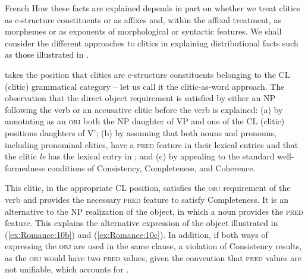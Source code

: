 \documentclass[output=paper,hidelinks]{langscibook}
\begin{document}
\ea\label{ex:Romance:10}French \citep[88]{Grimshaw1982}
\z\z
How these facts are explained depends in part on whether we treat clitics as c-structure constituents or as affixes and, within the affixal treatment, as morphemes or as exponents of morphological or syntactic features. We shall consider the different approaches to clitics in explaining distributional facts such as those illustrated in .

\citet{Grimshaw1982} takes the position that clitics are c-structure constituents belonging to the CL (clitic) grammatical category -- let us call it the clitic-as-word approach. The observation that the direct object requirement is satisfied by either an NP following the verb or an accusative clitic before the verb is explained: (a) by annotating as an \textsc{obj} both the NP daughter of VP and one of the CL (clitic) positions daughters of V'; (b) by assuming that both nouns and pronouns, including pronominal clitics, have a \textsc{pred} feature in their lexical entries and that the clitic \textit{le} has the lexical entry in ; and (c) by appealing to the standard well-formedness conditions of Consistency, Completeness, and Coherence.

\ea\label{ex:Romance:11}
\z
This clitic, in the appropriate CL position, satisfies the \textsc{obj} requirement of the verb and provides the necessary \textsc{pred} feature to satisfy Completeness. It is an alternative to the NP realization of the object, in which a noun provides the \textsc{pred} feature. This explains the alternative expression of the object illustrated in (\ref{ex:Romance:10b}) and (\ref{ex:Romance:10c}). In addition, if both ways of expressing the \textsc{obj} are used in the same clause, a violation of Consistency results, as the \textsc{obj} would have two \textsc{pred} values, given the convention that \textsc{pred} values are not unifiable, which accounts for .
\end{document}
